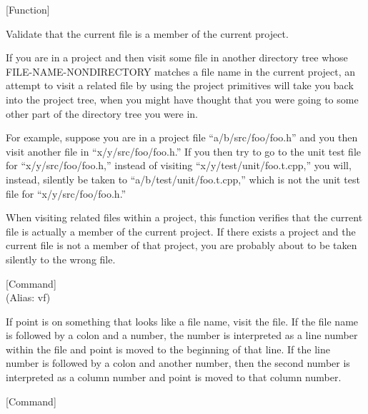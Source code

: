 \vspace{1em}
\noindent
{}
\usebox{\funcname}
 \hfill [Function]

\begin{doc-string}
Validate that the current file is a member of the current project.

If you are in a project and then visit some file in another directory tree whose
FILE-NAME-NONDIRECTORY matches a file name in the current project, an attempt to
visit a related file by using the project primitives will take you back into the
project tree, when you might have thought that you were going to some other part
of the directory tree you were in.

For example, suppose you are in a project file ``a/b/src/foo/foo.h'' and you
then visit another file in ``x/y/src/foo/foo.h.'' If you then try to go to the
unit test file for ``x/y/src/foo/foo.h,'' instead of visiting
``x/y/test/unit/foo.t.cpp,'' you will, instead, silently be taken to
``a/b/test/unit/foo.t.cpp,'' which is not the unit test file for
``x/y/src/foo/foo.h.''

When visiting related files within a project, this function verifies that the
current file is actually a member of the current project.  If there exists a
project and the current file is not a member of that project, you are probably
about to be taken silently to the wrong file.
\end{doc-string}

\vspace{1em}
\noindent
{}
\usebox{\funcname}
 \hfill [Command]\\%
 (Alias: vf)

\begin{doc-string}
If point is on something that looks like a file name, visit the file.  If the
file name is followed by a colon and a number, the number is interpreted as a
line number within the file and point is moved to the beginning of that line.
If the line number is followed by a colon and another number, then the second
number is interpreted as a column number and point is moved to that column
number.
\end{doc-string}

\vspace{1em}
\noindent
{}
\usebox{\funcname}
 \hfill [Command]

